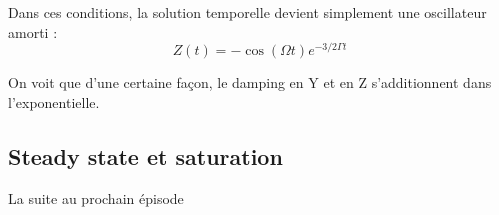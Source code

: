 \documentclass[a4paper]{report}
\begin{document}
   Dans ces conditions, la solution temporelle devient simplement une oscillateur amorti : \begin{equation}
   Z(t)=-\cos (\Omega t) e^{-3/2\Gamma t}
   \end{equation}
   
   On voit que d'une certaine façon, le damping en Y et en Z s'additionnent dans l'exponentielle.
   \subsection{Steady state et saturation}
   La suite au prochain épisode
 
  
\end{document}
